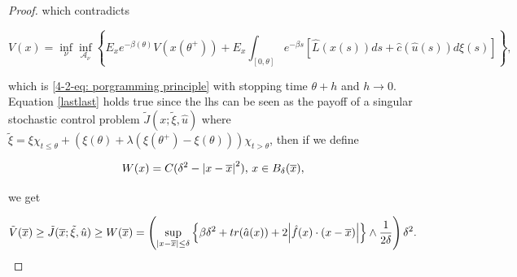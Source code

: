 \begin{theorem}
\begin{proof}
        which contradicts

        \begin{equation*}
            V(x) = \inf_{\nu} \inf_{\mathcal{A}_{\nu}} \left\{E_x e^{-\beta(\theta)}V(x(\theta^+)) + E_x\int_{[0,\theta]}e^{-\beta s}\left[\hat{L}(x(s))ds + \hat{c}(\hat{u}(s))d\xi(s)\right]\right\},
        \end{equation*}

        which is \eqref{4-2-eq: porgramming principle} with stopping time $\theta+h$ and $h\to0$. Equation \eqref{lastlast} holds true since the lhs can be seen as the payoff of a singular stochastic control problem $\tilde{J}(x;\tilde{\xi},\hat{u})$ where $\tilde{\xi}=\xi\chi_{t\leq\theta} + (\xi(\theta) + \lambda(\xi(\theta^+)-\xi(\theta)))\chi_{t>\theta}$, then if we define 
        
        \[W(x)=C(\delta^2-\abs{x-\overline{x}}^2),\, x\in B_{\delta}(\overline{x}),\]

        we get 

        \[\tilde{V}(\overline{x})\geq \tilde{J}(\overline{x};\tilde{\xi},\hat{u})\geq W(\overline{x})=\left(\sup_{\abs{x-\overline{x}}\leq\delta}\left\{\beta\delta^2+tr(\hat{a}(x))+2\abs{\hat{f}(x)\cdot(x-\overline{x})}\right\}\land \frac{1}{2\delta}\right)\delta^2.\]
    \end{proof}
\end{theorem}